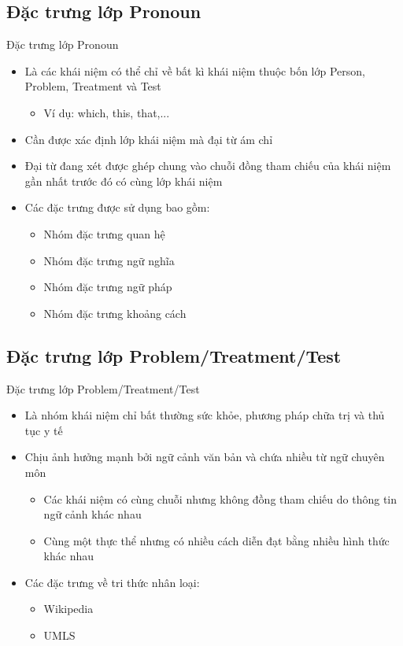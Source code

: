\subsection{Đặc trưng lớp Pronoun}
\begin{frame}{Đặc trưng lớp Pronoun}
\putlogo
\begin{itemize}
	\item Là các khái niệm có thể chỉ về bất kì khái niệm thuộc bốn lớp Person, Problem, Treatment và Test
	\begin{itemize}
		\item Ví dụ: which, this, that,...
	\end{itemize}
	\item Cần được xác định lớp khái niệm mà đại từ ám chỉ
	\item Đại từ đang xét được ghép chung vào chuỗi đồng tham chiếu của khái niệm gần nhất trước đó có cùng lớp khái niệm
	\item Các đặc trưng được sử dụng bao gồm:
	\begin{itemize}
		\item Nhóm đặc trưng quan hệ
		\item Nhóm đặc trưng ngữ nghĩa
		\item Nhóm đặc trưng ngữ pháp
		\item Nhóm đặc trưng khoảng cách
	\end{itemize}
\end{itemize}
\end{frame}

\subsection{Đặc trưng lớp Problem/Treatment/Test}
\begin{frame}{Đặc trưng lớp Problem/Treatment/Test}
\putlogo
\begin{itemize}
	\item Là nhóm khái niệm chỉ bất thường sức khỏe, phương pháp chữa trị và thủ tục y tế
	\item Chịu ảnh hưởng mạnh bởi ngữ cảnh văn bản và chứa nhiều từ ngữ chuyên môn
	\begin{itemize}
		\item Các khái niệm có cùng chuỗi nhưng không đồng tham chiếu do thông tin ngữ cảnh khác nhau
		\item Cùng một thực thể nhưng có nhiều cách diễn đạt bằng nhiều hình thức khác nhau
	\end{itemize}
	\item Các đặc trưng về tri thức nhân loại:
	\begin{itemize}
		\item Wikipedia
		\item UMLS
	\end{itemize}
\end{itemize}
\end{frame}

